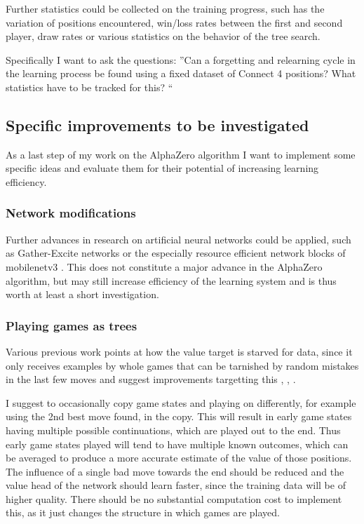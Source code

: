 \documentclass[12pt,onecolumn,oneside,titlepage]{article}
\begin{document}
Further statistics could be collected on the training progress, such has the variation of positions encountered, win/loss rates between the first and second player, draw rates or various statistics on the behavior of the tree search.

Specifically I want to ask the questions: ''Can a forgetting and relearning cycle in the learning process be found using a fixed dataset of Connect 4 positions? What statistics have to be tracked for this? ``

\subsection{Specific improvements to be investigated}

As a last step of my work on the AlphaZero algorithm I want to implement some specific ideas and evaluate them for their potential of increasing learning efficiency.

\subsubsection{Network modifications}

Further advances in research on artificial neural networks could be applied, such as Gather-Excite networks \cite{DBLP:journals/corr/abs-1810-12348} or the especially resource efficient network blocks of mobilenetv3 \cite{howard2019searching}.
This does not constitute a major advance in the AlphaZero algorithm, but may still increase efficiency of the learning system and is thus worth at least a short investigation.

\subsubsection{Playing games as trees}

Various previous work points at how the value target is starved for data, since it only receives examples by whole games that can be tarnished by random mistakes in the last few moves and suggest improvements targetting this \cite{wu2019accelerating}, \cite{oracledevs6}, \cite{lan2019multiple}.

I suggest to occasionally copy game states and playing on differently, for example using the 2nd best move found, in the copy.
This will result in early game states having multiple possible continuations, which are played out to the end. Thus early game states played will tend to have multiple known outcomes,
which can be averaged to produce a more accurate estimate of the value of those positions. The influence of a single bad move towards the end should be reduced and the value head of the network should learn faster, since the training data will be of higher quality.
There should be no substantial computation cost to implement this, as it just changes the structure in which games are played.
\end{document}
